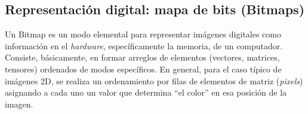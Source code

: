 %
%
%
%
%
%
%
%
%
%

\subsection{Representaci\'on digital: mapa de bits (Bitmaps)}

Un Bitmap es un modo elemental para representar im\'agenes digitales como informaci\'on en el \textit{hardware}, espec\'ificamente la memoria, de un
computador.
%
Consiste, b\'asicamente, en formar arreglos de elementos (vectores, matrices, tensores) ordenados de modos espec\'ificos.
%
En general, para el caso t\'ipico de im\'agenes 2D, se realiza un ordenamiento por filas de elementos de matriz (\textit{pixels}) asignando a cada uno
un valor que determina ``el color'' en esa posici\'on de la imagen.
%

